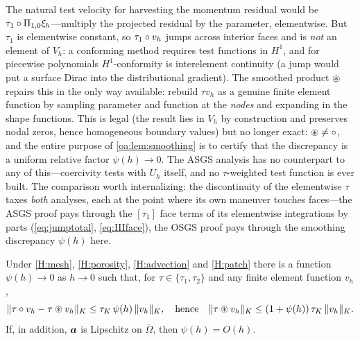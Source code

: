 \begin{pedagogy}
The natural test velocity for harvesting the momentum residual would be
$\tau_1 \circ \Pi_{1,0}\xi_h$---multiply the projected residual by the parameter,
elementwise. But $\tau_1$ is elementwise constant, so $\tau_1 \circ v_h$ jumps
across interior faces and is \emph{not} an element of $V_h$: a conforming
method requires test functions in $H^1$, and for piecewise polynomials
$H^1$-conformity is interelement continuity (a jump would put a surface Dirac
into the distributional gradient). The smoothed product $\circledast$ repairs this in
the only way available: rebuild $\tau v_h$ as a genuine finite element function
by sampling parameter and function at the \emph{nodes} and expanding in the
shape functions. This is legal (the result lies in $V_h$ by construction and
preserves nodal zeros, hence homogeneous boundary values) but no longer exact:
$\circledast \ne \circ$, and the entire purpose of \cref{oa:lem:smoothing} is to
certify that the discrepancy is a uniform relative factor $\psi(h) \to 0$. The
ASGS analysis has no counterpart to any of this---coercivity tests with $U_h$
itself, and no $\tau$-weighted test function is ever built. The comparison
worth internalizing: the discontinuity of the elementwise $\tau$ taxes
\emph{both} analyses, each at the point where its own maneuver touches
faces---the ASGS proof pays through the $[\tau_1]$ face terms of its elementwise
integrations by parts (\cref{eq:jumptotal}, \cref{eq:IIIface}), the OSGS proof
pays through the smoothing discrepancy $\psi(h)$ here.
\end{pedagogy}

\begin{lemma}
\label{oa:lem:smoothing}
Under \cref{H:mesh}, \cref{H:porosity}, \cref{H:advection} and \cref{H:patch} there is a function $\psi(h) \to 0$
as $h \to 0$ such that, for $\tau \in \{\tau_1, \tau_2\}$ and any finite element
function $v_h$,
\begin{equation}
  \label{oa:eq:Smoothing}
  \lVert \tau\circ v_h - \tau\circledast v_h \rVert_{K} \le \tau_K\,\psi(h)\,\lVert v_h \rVert_{K},
  \quad\text{hence}\quad
  \lVert \tau\circledast v_h \rVert_{K} \le (1+\psi(h))\,\tau_K\,\lVert v_h \rVert_{K}.
\end{equation}
If, in addition, $\boldsymbol{a}$ is Lipschitz on $\overline\Omega$, then $\psi(h) = O(h)$.
\end{lemma}

